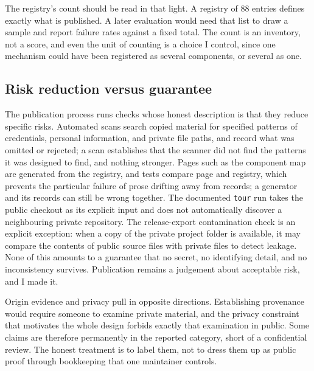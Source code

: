 \documentclass[11pt]{article}
\newcommand{\code}[1]{\texttt{#1}}
\newcommand{\componentcount}{88}
\begin{document}
The registry's count should be read in that light. A registry of
\componentcount{} entries defines exactly what is published. A later
evaluation would need that list to draw a sample and report failure rates
against a fixed total. The count is an inventory, not a score, and
even the unit of counting is a choice I control, since one mechanism could
have been registered as several components, or several as one.

\subsection*{Risk reduction versus guarantee}

The publication process runs checks whose honest description is that they
reduce specific risks. Automated scans search copied material for specified
patterns of credentials, personal information, and private file paths, and
record what was omitted or rejected; a scan establishes that the scanner
did not find the patterns it was designed to find, and nothing stronger.
Pages such as the component map are generated from the registry, and tests
compare page and registry, which prevents the particular failure of prose
drifting away from records; a generator and its records can still be wrong
together. The documented \code{tour} run takes the public checkout as its
explicit input and does not automatically discover a neighbouring private
repository. The release-export contamination check is an explicit
exception: when a copy of the private project folder is available, it may
compare the contents of public source files with private files to detect
leakage. None of this
amounts to a guarantee that no secret, no identifying detail, and no
inconsistency survives. Publication remains a judgement about acceptable
risk, and I made it.

Origin evidence and privacy pull in opposite directions. Establishing
provenance would require someone to examine private
material, and the privacy constraint that motivates the whole design forbids
exactly that examination in public. Some claims are therefore permanently in
the reported category, short of a confidential review. The honest treatment
is to label them, not to dress them up as public proof through bookkeeping
that one maintainer controls.

\medskip
\end{document}
